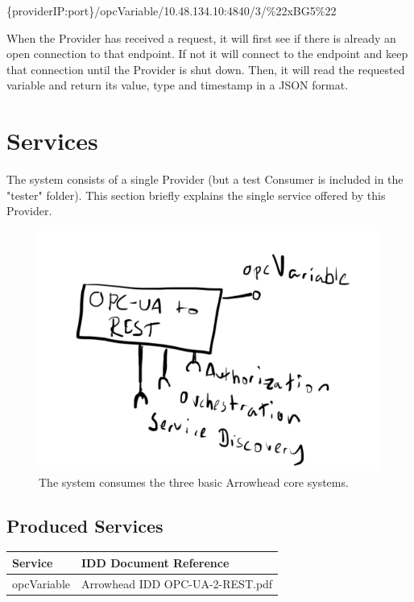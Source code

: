 \documentclass[a4paper]{arrowhead}
\begin{document}
\begin{tcolorbox}[colback=white!5!white,colframe=black!75!black,title=HTTP GET that is sent to the Provider]
\{providerIP:port\}/opcVariable/10.48.134.10:4840/3/\%22xBG5\%22
\end{tcolorbox}

When the Provider has received a request, it will first see if there is already an open connection to that endpoint. If not it will connect to the endpoint and keep that connection until the Provider is shut down. Then, it will read the requested variable and return its value, type and timestamp in a JSON format.


\section{Services}
\label{sec:services}

The system consists of a single Provider (but a test Consumer is included in the "tester" folder). This section briefly explains the single service offered by this Provider.

\begin{figure}[h]
  \center
  \includegraphics[scale=1.2]{fig/OPC-2-REST_SysD.png}
  \caption{The system consumes the three basic Arrowhead core systems.}
  \label{fig:sysd}
\end{figure}

\subsection{Produced Services}
\noindent\begin{tabularx}{\textwidth}{| p{5.8cm} | X |} \hline
\rowcolor{gray!33} Service & IDD Document Reference \\ \hline

opcVariable                  & Arrowhead IDD OPC-UA-2-REST.pdf \\ \hline

\end{tabularx}
\end{document}

